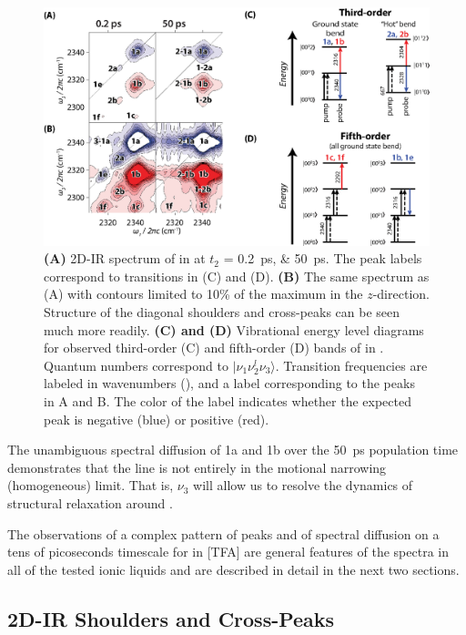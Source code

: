 \documentclass[%
  class = book,%
  crop = false,%
  float = true,%
  multi = true,%
  preview = false,%
]{standalone}
\begin{document}
{\begin{figure}
  \centering
  \includegraphics[scale=1]{fig5_update4.eps}
  \caption[2D-IR spectra of \texorpdfstring{}{carbon dioxide} in ionic liquids]{\label{fig:example 2D}\textbf{(A)} 2D-IR spectrum of  in \ce{[Im_{4,1}][TFA]} at \(t_2\) = \SIlist[list-units = single]{0.2;50}{\ps}. The peak labels correspond to transitions in (C) and (D). \textbf{(B)} The same spectrum as (A) with contours limited to 10\% of the maximum in the $z$-direction. Structure of the diagonal shoulders and cross-peaks can be seen much more readily. \textbf{(C) and (D)} Vibrational energy level diagrams for observed third-order (C) and fifth-order (D) bands of  in \ce{[Im_{4,1}][TFA]}. Quantum numbers correspond to $|\nu_1 \nu_2^l \nu_3\rangle$. Transition frequencies are labeled in wavenumbers (\si{\wavenumber}), and a label corresponding to the peaks in A and B. The color of the label indicates whether the expected peak is negative (blue) or positive (red).}
\end{figure}

The unambiguous spectral diffusion of 1a and 1b over the \SI{50}{\ps} population time demonstrates that the line is not entirely in the motional narrowing (homogeneous) limit. That is, \(\nu_3\) will allow us to resolve the dynamics of structural relaxation around .

The observations of a complex pattern of peaks and of spectral diffusion on a tens of picoseconds timescale for  in \ce{[Im_{4,1}]}[TFA]  are general features of the spectra in all of the tested ionic liquids and are described in detail in the next two sections.

\subsection{2D-IR Shoulders and Cross-Peaks}
\label{sec:shoulders}

}
\end{document}
